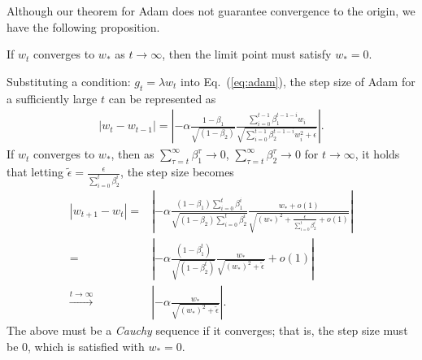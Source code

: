 \documentclass[conference]{IEEEtran}
\begin{document}
Although our theorem for Adam does not guarantee convergence to the origin, we have the following proposition.
\begin{prop}
If $w_t$ converges to $w_{*}$ as $t \to \infty$,
then the limit point must satisfy $w_{*} = 0$.  \\
\end{prop}
\noindent Substituting a condition: $g_t = \lambda w_t$ into Eq.~(\ref{eq:adam}), the step size of Adam for a sufficiently large $t$ can be represented as \\
\begin{align*}
|w_t - w_{t-1}| = \left|- \alpha \frac{1 - \beta_1}{\sqrt{\left( 1 - \beta_2 \right)}} \frac{\sum_{i=0}^{t-1}\beta_1^{t-1-i}w_i}{\sqrt{\sum_{i=0}^{t-1}\beta_2^{t-1-i}w_i^2 + \epsilon}} \right|.
\end{align*}
If $w_t$ converges to $w_{*}$, 
then as $\sum_{\tau=t}^\infty \beta_1^\tau \to 0$, 
$\sum_{\tau=t}^\infty \beta_2^\tau \to 0$ for $t\to \infty$,
it holds that 
letting $\tilde{\epsilon} = \frac{\epsilon}{\sum_{i=0}^t \beta_2^{i}}$, the step size becomes
\footnotesize
\begin{align*}
|w_{t+1} - w_{t}| 
= &  \left|- \alpha \frac{\left(1 - \beta_1 \right)\sum_{i=0}^t
\beta_1^{i}}{\sqrt{\left( 1 - \beta_2 \right)\sum_{i=0}^t\beta_2^{i}}} \frac{w_{*} + o(1)}{\sqrt{\left(w_{*} \right)^2 + \frac{\epsilon}{\sum_{i=0}^t \beta_2^{i}}+ o(1)}} \right| \\
= &  \left|- \alpha \frac{\left(1 - \beta_1^t \right)}{\sqrt{\left( 1 - \beta_2^t \right)}} \frac{w_{*}}{\sqrt{\left(w_{*} \right)^2 + \tilde{\epsilon}}} 
+ o(1)
\right| \\
\stackrel{t \to \infty}{\longrightarrow}  & \left|- \alpha \frac{w_{*}}{\sqrt{\left(w_{*} \right)^2 + \tilde{\epsilon}}
} \right|.
\end{align*}
\normalsize
The above must be a \textit{Cauchy} sequence if it converges; that is, the step size must be 0, which is satisfied with $w_*=0$. \\

\end{document}
